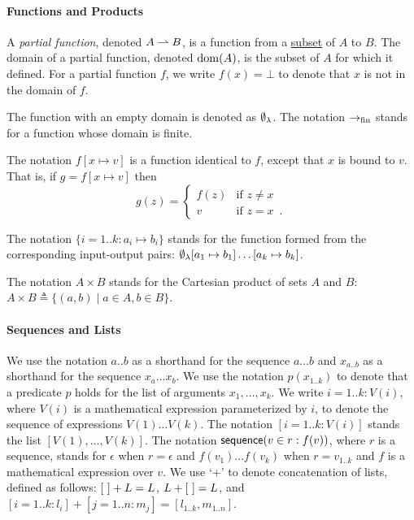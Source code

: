 \paragraph{Functions and Products \label{sec:FunctionsAndProducts}}

\begin{definition}
  A \emph{partial function}, denoted $A \rightharpoonup B$, is a function from a \underline{subset} of $A$ to $B$.
  The domain of a partial function, denoted $\operatorname{dom}(A)$, is the subset of $A$ for which it defined.
  For a partial function $f$, we write $f(x) = \bot$ to denote that $x$ is not in the domain of $f$.
\end{definition}

The function with an empty domain is denoted as ${\emptyset}_\lambda$.
The notation $\rightarrow_{\text{fin}}$ stands for a function whose domain is finite.

\begin{definition}
  The notation $f[x \mapsto v]$ is a function identical to $f$, except that $x$ is bound
  to $v$. That is, if  $g = f[x \mapsto v]$ then
  \[
    g(z) =
  \begin{cases}
    f(z) & \text{if } z \neq x\\
    v & \text{if } z = x \enspace .
  \end{cases}
  \]

  The notation $\{i=1..k: a_i\mapsto b_i\}$ stands for the function formed from the corresponding input-output pairs:
  ${\emptyset}_\lambda[a_1\mapsto b_1]\ldots[a_k\mapsto b_k]$.
\end{definition}

The notation $A \times B$ stands for the Cartesian product of sets $A$ and $B$: $A \times B \triangleq \{(a,b) \;|\; a \in A, b \in B\}$.

\paragraph{Sequences and Lists}
We use the notation $a..b$ as a shorthand for the sequence $a\ldots b$ and $x_{a..b}$ as a shorthand for the sequence $x_a \ldots x_b$.
%
We use the notation $p(x_{1..k})$ to denote that a predicate $p$ holds for the list of arguments $x_1,\ldots,x_k$.
%
We write $i=1..k: V(i)$, where $V(i)$ is a mathematical expression parameterized by $i$,
to denote the sequence of expressions $V(1) \ldots V(k)$.
The notation $[i=1..k: V(i)]$ stands the list $[V(1),\ldots,V(k)]$.
The notation $\textsf{sequence}(v\in r: f(v))$, where $r$ is a sequence, stands for $\epsilon$ when $r=\epsilon$ and
$f(v_1) \ldots f(v_k)$ when $r=v_{1..k}$ and $f$ is a mathematical expression over $v$.
%
We use `+' to denote concatenation of lists, defined as follows: $[\ ] + L = L$, $L + [\ ] = L$, and $[i=1..k: l_i] + [j=1..n: m_j] = [l_{1..k}, m_{1..n}]$.

